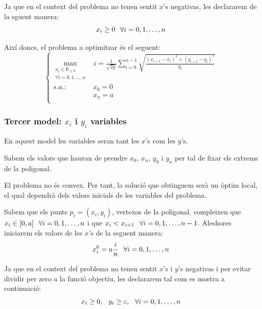 \documentclass[10pt]{extarticle}
\begin{document}
Ja que en el context del problema no tenen sentit $x$'s negativas, les declararem de la sguent manera:
$$x_i \ge 0 \hspace{.25cm} \forall i=0,1,\hdots,n$$

Així doncs, el problema a optimitzar és el seguent:
\begin{equation*}
    \left\{
    \begin{array}{ll}
        \displaystyle{\max\limits_{\substack{x_i \in \mathbb{R}_{\ge0} \\ \forall i = 0,1,\hdots,n}}} & \displaystyle{z = \frac{1}{\sqrt{2g}} \sum_{i = 0}^{n-1} \sqrt{\frac{(x_{i+1}-x_i)^2+(y_{i+1}-y_i)^2}{y_i}}} \\
        s.a.: & \displaystyle{x_0} = 0 \\
        & \displaystyle{x_n} = a \\
    \end{array}
    \right.
\end{equation*}

\subsubsection{Tercer model: $x_i$ i $y_i$ variables}
En aquest model les variables seran tant les $x$'s com les $y$'s. \vspace{.25cm}

Sabem els valors que hauran de prendre $x_0$, $x_n$, $y_0$ i $y_n$ per tal de fixar els extrems de la poligonal. \vspace{.25cm}

El problema no és convex. Per tant, la solució que obtinguem serà un òptim local, el qual dependrà dels valors inicials de les variables del problema. \vspace{.25cm}

Sabem que els punts $p_i = (x_i,y_i)$, vertexos de la poligonal, compleixen que $x_i \in [0,a] \hspace{.25cm} \forall i = 0,1,\hdots,n$ i que $x_i < x_{i+1} \hspace{.25cm} \forall i = 0,1,\hdots,n-1$. Aleshores iniciarem els valors de les $x$'s de la seguent manera:
$$x_i^0 = a\frac{i}{n} \hspace{.25cm} \forall i = 0,1,\hdots,n$$

Ja que en el context del problema no tenen sentit $x$'s i $y$'s negativas i per evitar dividir per zero a la funció objectiu, les declararem tal com es mostra a continuació:
$$x_i \ge 0, \hspace{.25cm} y_i \ge \varepsilon, \hspace{.25cm} \forall i=0,1,\hdots,n$$
\end{document}
